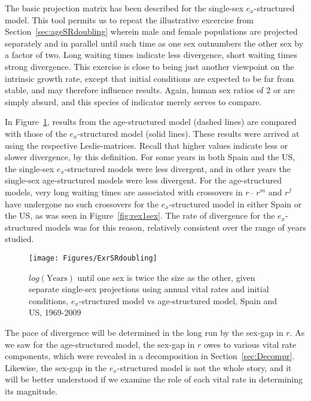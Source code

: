  \FloatBarrier
The basic projection matrix has been described for the single-sex
$e_x$-structured model. This tool permits us to repeat the illustrative
excercise from Section~\ref{sec:ageSRdoubling} wherein male and female populations are
projected separately and in parallel until such time as one sex outnumbers the
other sex by a factor of two. Long waiting times indicate less divergence, short
waiting times strong divergence. This exercise is close to being just another
viewpoint on the intrinsic growth rate, except that initial conditions are
expected to be far from stable, and may therefore influence results. Again,
human sex ratios of 2 or \textonehalf are simply absurd, and this species of
indicator merely serves to compare.

In Figure~\ref{fig:exSRdoubling}, results from the age-structured model (dashed
lines) are compared with those of the $e_x$-structured model (solid lines).
These results were arrived at using the respective Leslie-matrices. Recall that
higher values indicate less or slower divergence, by this definition. For some 
years in both Spain and the US, the single-sex $e_x$-structured models were less 
divergent, and in other years the single-sex age-structured models were less divergent.
 For the age-structured models, very long waiting times are associated
with crossovers in $r$-- $r^m$ and $r^f$ have undergone no such crossovers for
the $e_x$-structured model in either Spain or the US, as was seen in
Figure~\ref{fig:rex1sex}. The rate of divergence for the $e_x$-structured models
was for this reason, relatively consistent over the range of years studied. 

\begin{figure}[ht!]
        \centering  
          \caption{$log(\mathrm{Years})$ until one sex is twice the size as the
          other, given separate single-sex projections using annual vital rates and initial
          conditions, $e_x$-structured model vs age-structured model, Spain
          and US, 1969-2009}
           \texttt{[image: Figures/ExrSRdoubling]}
          \label{fig:exSRdoubling}
\end{figure}

The pace of divergence will be determined in the long run by the sex-gap in $r$.
As we saw for the age-structured model, the sex-gap in $r$ owes to various vital
rate components, which were revealed in a decomposition in
Section~\ref{sec:Decompr}. Likewise, the sex-gap in the $e_x$-structured model
is not the whole story, and it will be better understood if we examine the role
of each vital rate in determining its magnitude.

 \FloatBarrier